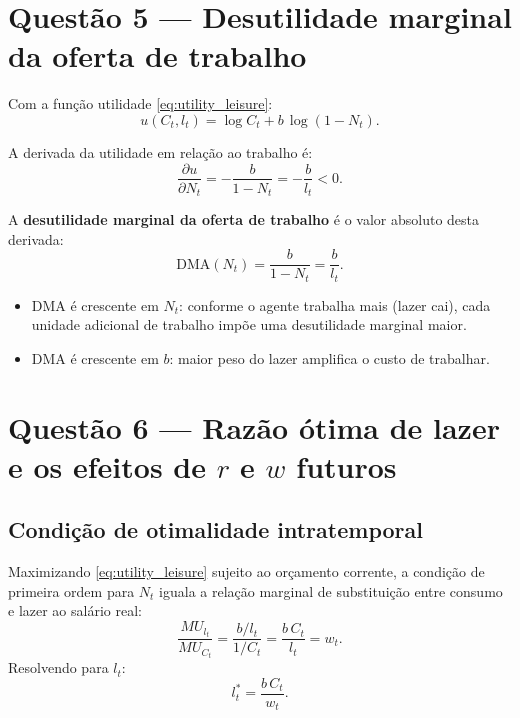 \documentclass[11pt,a4paper]{article}
\begin{document}
\section{Questão 5 --- Desutilidade marginal da oferta de trabalho}

Com a função utilidade \eqref{eq:utility_leisure}:
\[
  u(C_t, l_t) = \log C_t + b\,\log(1-N_t).
\]

A derivada da utilidade em relação ao trabalho é:
\begin{equation}
  \frac{\partial u}{\partial N_t} = -\frac{b}{1-N_t} = -\frac{b}{l_t} < 0.
\end{equation}

A \textbf{desutilidade marginal da oferta de trabalho} é o valor absoluto desta derivada:
\begin{equation}\label{eq:mud}
  \boxed{
    \text{DMA}(N_t) = \frac{b}{1-N_t} = \frac{b}{l_t}.
  }
\end{equation}

\begin{itemize}
  \item DMA é crescente em $N_t$: conforme o agente trabalha mais (lazer cai), cada
    unidade adicional de trabalho impõe uma desutilidade marginal maior.
  \item DMA é crescente em $b$: maior peso do lazer amplifica o custo de trabalhar.
\end{itemize}

\section{Questão 6 --- Razão ótima de lazer e os efeitos de $r$ e $w$ futuros}

\subsection{Condição de otimalidade intratemporal}

Maximizando \eqref{eq:utility_leisure} sujeito ao orçamento corrente, a condição
de primeira ordem para $N_t$ iguala a relação marginal de substituição entre
consumo e lazer ao salário real:
\begin{equation}\label{eq:intratemporal}
  \frac{MU_{l_t}}{MU_{C_t}} = \frac{b/l_t}{1/C_t} = \frac{b\,C_t}{l_t} = w_t.
\end{equation}
Resolvendo para $l_t$:
\begin{equation}\label{eq:optimal_leisure}
  \boxed{l_t^* = \frac{b\,C_t}{w_t}.}
\end{equation}
\end{document}
